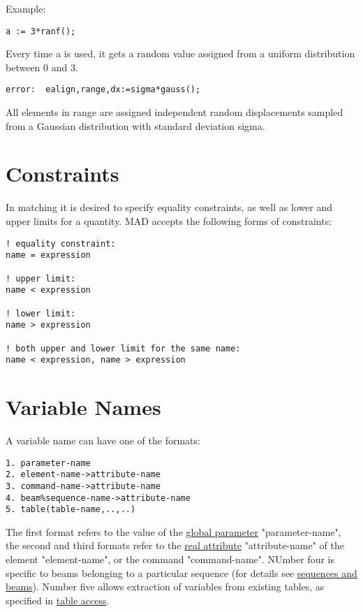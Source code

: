 Example: 
\begin{verbatim}
a := 3*ranf();
\end{verbatim} 
Every time a is used, it gets a random value assigned from a uniform
distribution between 0 and 3.  

\begin{verbatim}
error:  ealign,range,dx:=sigma*gauss();
\end{verbatim} 
All elements in range are assigned independent random displacements
sampled from a Gaussian distribution with standard deviation sigma.  



%
\section{Constraints}
\label{sec:constraints}
In matching it is desired to specify equality constraints, as well as
lower and upper limits for a quantity. MAD accepts the following forms
of constraints:  
\begin{verbatim}
! equality constraint:
name = expression

! upper limit:
name < expression

! lower limit:
name > expression

! both upper and lower limit for the same name:
name < expression, name > expression
\end{verbatim}



%
\section{Variable Names}
\label{sec:variable}
A variable name can have one of the formats: 
\begin{verbatim}
1. parameter-name
2. element-name->attribute-name
3. command-name->attribute-name
4. beam%sequence-name->attribute-name
5. table(table-name,..,..)
\end{verbatim} 

The first format refers to the value of the \href{parameter.html}{global
  parameter} "parameter-name", the second and third formats refer to the
\href{real.html}{real attribute} "attribute-name" of the element
"element-name", or the command "command-name". NUmber four is specific
to beams belonging to a particular sequence (for details see
\href{sequence.html#beam}{sequences and beams}). Number five allows
extraction of variables from existing tables, as specified in
\href{expression.html#table}{table access}.  



